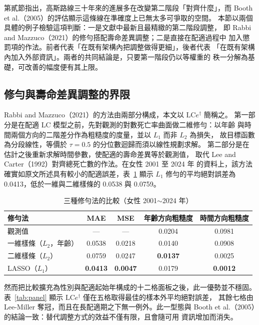 \documentclass[UTF8, fontset=macnew, a4paper, 12pt]{ctexart}
\newcommand{\LCe}{\mathrm{LC}e^{\dagger}}
\begin{document}
第貳節指出，高斯路線三十年來的進展多在改變第二階段「對齊什麼」，而
Booth et al.（2005）的評估顯示這條線在準確度上已無太多可爭取的空間。
本節以兩個具體的例子檢驗這項判斷：一是文獻中最新且最精緻的第二階段調整，
即 Rabbi and Mazzuco（2021）的修勻搭配壽命差異調整；二是直接在配適過程中
加入懲罰項的作法。前者代表「在既有架構內把調整做得更細」，後者代表
「在既有架構內加入外部資訊」。兩者的共同結論是，只要第一階段仍以等權重的
秩一分解為基礎，可改善的幅度便有其上限。

\subsection{修勻與壽命差異調整的界限}

Rabbi and Mazzuco（2021）的方法由兩部分構成，本文以 $\LCe$ 簡稱之。
第一部分是在配適 LC 模型之前，先對觀測的對數死亡率曲面做二維修勻：以年齡
與時間兩個方向的二階差分作為粗糙度的度量，並以 $L_1$ 而非 $L_2$ 為損失，
故目標函數為分段線性，等價於 $\tau=0.5$ 的分位數迴歸而須以線性規劃求解。
第二部分是在估計之後重新求解時間參數，使配適的壽命差異等於觀測值，
取代 Lee and Carter（1992）對齊總死亡數的作法。在女性 2001 至 2024 年
的資料上，該方法確實如原文所述具有較小的配適誤差，表~\ref{tab:smooth} 顯示
$L_1$ 修勻的平均絕對誤差為 0.0413，低於一維與二維樣條的 0.0538 與 0.0759。

\begin{table}[H]
\centering
\caption{三種修勻法的比較（女性 2001$\sim$2024 年）}
\small
\begin{tabular}{lcccc}
\toprule
修勻法 & MAE & MSE & 年齡方向粗糙度 & 時間方向粗糙度\\
\midrule
觀測值 & --- & --- & 0.0204 & 0.0981\\
一維樣條（$L_2$，年齡） & 0.0538 & 0.0218 & 0.0140 & 0.0908\\
二維樣條（$L_2$） & 0.0759 & 0.0247 & \textbf{0.0137} & 0.0025\\
LASSO（$L_1$） & \textbf{0.0413} & \textbf{0.0047} & 0.0179 & \textbf{0.0012}\\
\bottomrule
\end{tabular}
\label{tab:smooth}
\end{table}

然而把比較擴充為性別與配適起始年構成的十二格面板之後，此一優勢並不穩固。
表~\ref{tab:panel} 顯示 $\LCe$ 僅在五格取得最佳的樣本外平均絕對誤差，
其餘七格由 Lee-Miller 奪冠，而且在長配適期之下無一例外。此一型態與
Booth et al.（2005）的結論一致：替代調整方式的效益不僅有限，且會隨可用
資訊增加而消失。
\end{document}
